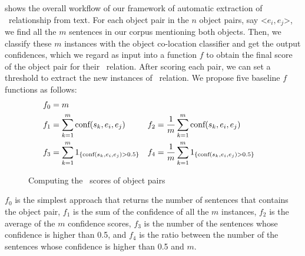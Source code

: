  shows the overall workflow of our framework of
automatic extraction of \lnear\ relationship from text. 
For each object pair in the $n$ object pairs, say \textless$e_i,e_j$\textgreater , 
we find all the $m$ sentences in our corpus mentioning both objects. 
Then, we classify these $m$ instances with the object
co-location classifier and get the output confidences, which we regard as input into a function $f$ to obtain the final score of the object pair for their \lnear\ relation. After scoring each pair, we can set a threshold to extract the new instances of \lnear\ relation.
We propose five baseline $f$ functions as follows:
\begin{align*}
	f_0 &= m\\
	f_1&=\sum_{k=1}^{m} \textnormal{conf}(s_k,e_i,e_j) &f_2&=\frac{1}{m}\sum_{k=1}^{m} \textnormal{conf}(s_k,e_i,e_j)\\
	f_3&=\sum_{k=1}^{m}
	1_{ \{ \textnormal{conf}(s_k,e_i,e_j)>0.5 \} } 
	&f_4&=\frac{1}{m}\sum_{k=1}^{m} 
	1_{ \{ \textnormal{conf}(s_k,e_i,e_j)>0.5 \} }
\end{align*}

\begin{figure*}[th]
	\centering
	\caption{Computing the \lnear\ scores of object pairs}
	\label{fig:overview}
\end{figure*}
$f_0$ is the simplest approach that returns the number of sentences
that contains the object pair,
$f_1$ is the sum of the confidence of all the $m$ instances, $f_2$ is the average of the $m$ confidence scores, 
$f_3$ is the number of the sentences whose confidence is higher than 0.5, 
and $f_4$ is the ratio between the number of the sentences whose confidence is higher than 0.5 and $m$.

